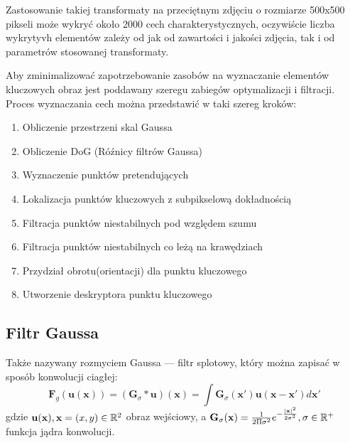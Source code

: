 Zastosowanie takiej transformaty na przeciętnym zdjęciu o rozmiarze 500x500 pikseli może wykryć około 2000 cech charakterystycznych, oczywiście liczba wykrytyvh elementów zależy od jak od zawartości i jakości zdjęcia, tak i od parametrów stosowanej transformaty.

Aby zminimalizować zapotrzebowanie zasobów na wyznaczanie elementów kluczowych obraz jest poddawany szeregu zabiegów optymalizacji i filtracji. Proces wyznaczania cech można przedstawić w taki szereg kroków:
\begin{enumerate}
   \item Obliczenie przestrzeni skal Gaussa
   \item Obliczenie DoG (Róźnicy filtrów Gaussa)
   \item Wyznaczenie punktów pretendujących
   \item Lokalizacja punktów kluczowych z subpikselową dokładnością
   \item Filtracja punktów niestabilnych pod względem szumu
   \item Filtracja punktów niestabilnych co leżą na krawędziach
   \item Przydział obrotu(orientacji) dla punktu kluczowego
   \item Utworzenie deskryptora punktu kluczowego
\end{enumerate}

\subsection{Filtr Gaussa}

   Także nazywany rozmyciem Gaussa --- filtr splotowy, który można zapisać w sposób konwolucji ciagłej:
   \begin{equation} \label{eq:gauss_c}
      \mathbf{F}_{g}(\mathbf{u}(\mathbf{x}))
      = (\mathbf{G}_{\sigma} * \mathbf{u}) (\mathbf{x})
      = \int \mathbf{G}_{\sigma}(\mathbf{x}') \mathbf{u}(\mathbf{x}-\mathbf{x}') d\mathbf{x}'
   \end{equation}
   gdzie $ \mathbf{u}(\mathbf{x}) , \smallskip \mathbf{x} = (x, y) \in \mathbb{R}^2 $ obraz wejściowy,
   a $ \mathbf{G}_{\sigma}(\mathbf{x}) = \frac{1}{2 \Pi \sigma^2} e^{-\frac{ | \mathbf{x} |^2}{2\sigma^2} },
   \smallskip \sigma \in \mathbb{R}^+ $ funkcja jądra konwolucji.

